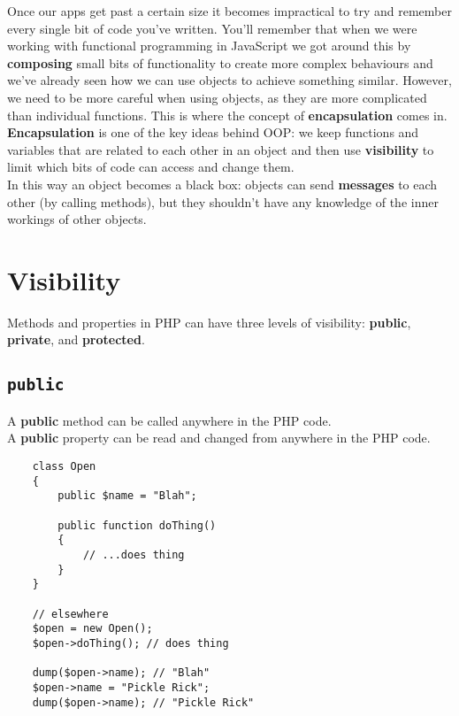 Once our apps get past a certain size it becomes impractical to try and remember every single bit of code you've written. You'll remember that when we were working with functional programming in JavaScript we got around this by \textbf{composing} small bits of functionality to create more complex behaviours and we've already seen how we can use objects to achieve something similar. However, we need to be more careful when using objects, as they are more complicated than individual functions. This is where the concept of \textbf{encapsulation} comes in.
\\

\textbf{Encapsulation} is one of the key ideas behind OOP: we keep functions and variables that are related to each other in an object and then use \textbf{visibility} to limit which bits of code can access and change them.
\\

In this way an object becomes a black box: objects can send \textbf{messages} to each other (by calling methods), but they shouldn't have any knowledge of the inner workings of other objects.


\section{Visibility}

Methods and properties in PHP can have three levels of visibility: \textbf{public}, \textbf{private}, and \textbf{protected}.

\subsection{\texttt{public}}

A \textbf{public} method can be called anywhere in the PHP code.
\\

A \textbf{public} property can be read and changed from anywhere in the PHP code.

\begin{verbatim}
    class Open
    {
        public $name = "Blah";

        public function doThing()
        {
            // ...does thing
        }
    }

    // elsewhere
    $open = new Open();
    $open->doThing(); // does thing

    dump($open->name); // "Blah"
    $open->name = "Pickle Rick";
    dump($open->name); // "Pickle Rick"
\end{verbatim}

